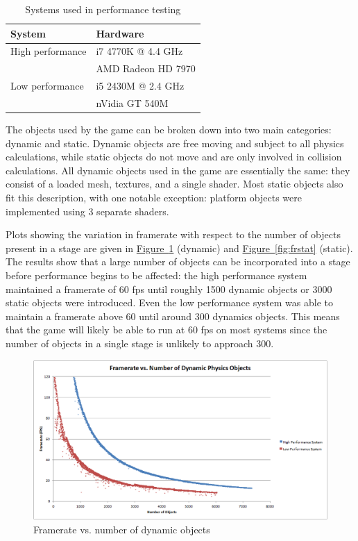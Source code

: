\documentclass[12pt, titlepage]{article}
\begin{document}
\begin{table}[ht]
\caption{Systems used in performance testing} \label{tab:systems}
\begin{tabularx}{\textwidth}{p{5cm}X}
\toprule {\bf System} & {\bf Hardware}\\
\midrule
High performance & i7 4770K @ 4.4 GHz\\
& AMD Radeon HD 7970\\[10pt]
Low performance & i5 2430M @ 2.4 GHz\\
& nVidia GT 540M\\
\bottomrule
\end{tabularx}
\end{table}

The objects used by the game can be broken down into two main categories:  dynamic and static.  Dynamic objects are free moving and subject to all physics calculations, while static objects do not move and are only involved in collision calculations.  All dynamic objects used in the game are essentially the same: they consist of a loaded mesh, textures, and a single shader.  Most static objects also fit this description, with one notable exception:  platform objects were implemented using 3 separate shaders.

Plots showing the variation in framerate with respect to the number of objects present in a stage are given in \hyperref[fig:frdynamic]{Figure~\ref*{fig:frdynamic}} (dynamic) and \hyperref[fig:frstat]{Figure~\ref*{fig:frstat}} (static).  The results show that a large number of objects can be incorporated into a stage before performance begins to be affected:  the high performance system maintained a framerate of 60 fps until roughly 1500 dynamic objects or 3000 static objects were introduced.  Even the low performance system was able to maintain a framerate above 60 until around 300 dynamics objects.  This means that the game will likely be able to run at 60 fps on most systems since the number of objects in a single stage is unlikely to approach 300.

\begin{figure}[h]
\centering
\includegraphics[width=\textwidth]{frameratedynamic}
\caption{Framerate vs. number of dynamic objects} \label{fig:frdynamic}
\end{figure}
\end{document}
